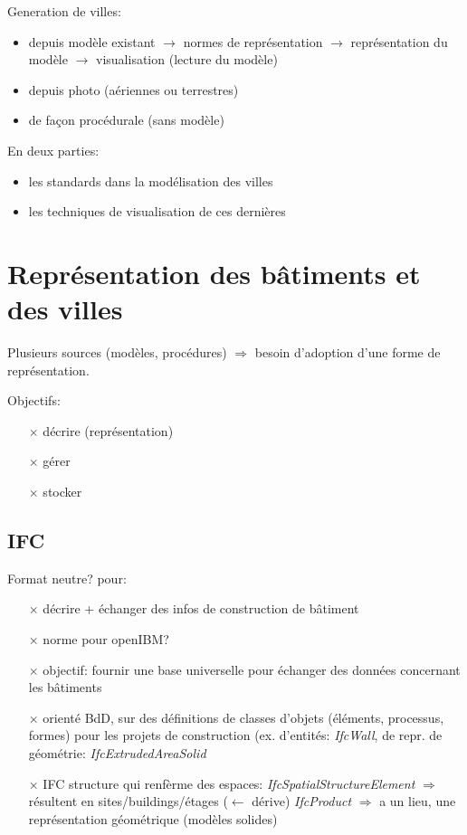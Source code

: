 \documentclass[11pt]{report}
\begin{document}
Generation de villes:

\begin{itemize}
	\item depuis modèle existant $\rightarrow$ normes de représentation $\rightarrow$ représentation du modèle $\rightarrow$ visualisation (lecture du modèle) 
	\item depuis photo (aériennes ou terrestres)
	\item de façon procédurale (sans modèle)
\end{itemize}

En deux parties: 
\begin{itemize}
	\item les standards dans la modélisation des villes
	\item les techniques de visualisation de ces dernières
\end{itemize}

\section{Représentation des bâtiments et des villes}

Plusieurs sources (modèles, procédures) $\Rightarrow$ besoin d'adoption d'une forme de représentation.

Objectifs:
\begin{itemize}
\item[$\times$] décrire (représentation)
\item[$\times$] gérer
\item[$\times$] stocker
\end{itemize}

\subsection{IFC}

Format neutre? pour:
\begin{itemize}
\item[$\times$] décrire + échanger des infos de construction de bâtiment
\item[$\times$] norme pour openIBM?
\item[$\times$] objectif: fournir une base universelle pour échanger des données concernant les bâtiments
\item[$\times$] orienté BdD, sur des définitions de classes d'objets (éléments, processus, formes) pour les projets de construction (ex. d'entités: \textit{IfcWall}, de repr. de géométrie: \textit{IfcExtrudedAreaSolid}
\item[$\times$] IFC structure qui renfèrme des espaces: \textit{IfcSpatialStructureElement} $\Rightarrow$ résultent en sites/buildings/étages ($\longleftarrow$ dérive) \textit{IfcProduct} $\Rightarrow$ a un lieu, une représentation géométrique (modèles solides)
\end{itemize}
\end{document}
